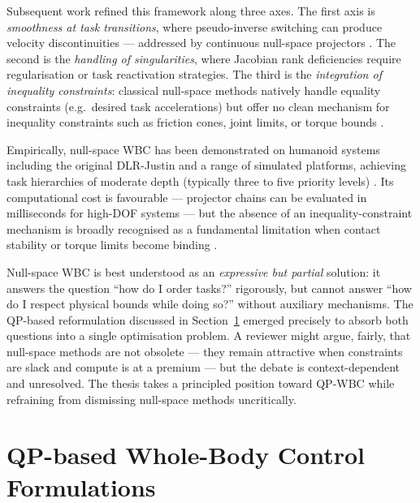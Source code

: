Subsequent work refined this framework along three axes. The first axis
is \emph{smoothness at task transitions}, where pseudo-inverse switching
can produce velocity discontinuities --- addressed by continuous
null-space projectors \cite{Sentis2005}. The second is the \emph{handling
of singularities}, where Jacobian rank deficiencies require regularisation
or task reactivation strategies. The third is the \emph{integration of
inequality constraints}: classical null-space methods natively handle
equality constraints (e.g.\ desired task accelerations) but offer no
clean mechanism for inequality constraints such as friction cones, joint
limits, or torque bounds \cite{Wensing2013}.

Empirically, null-space WBC has been demonstrated on humanoid systems
including the original DLR-Justin and a range of simulated platforms,
achieving task hierarchies of moderate depth (typically three to five
priority levels) \cite{Sentis2005}. Its computational cost is
favourable --- projector chains can be evaluated in milliseconds for
high-DOF systems --- but the absence of an inequality-constraint
mechanism is broadly recognised as a fundamental limitation when contact
stability or torque limits become binding \cite{Wensing2013,Koolen2016}.

\begin{criticalinsight}
Null-space WBC is best understood as an \emph{expressive but partial}
solution: it answers the question ``how do I order tasks?'' rigorously,
but cannot answer ``how do I respect physical bounds while doing so?''
without auxiliary mechanisms. The QP-based reformulation discussed in
Section~\ref{sec:sota_qp} emerged precisely to absorb both questions into
a single optimisation problem. A reviewer might argue, fairly, that
null-space methods are not obsolete --- they remain attractive when
constraints are slack and compute is at a premium --- but the debate is
context-dependent and unresolved. The thesis takes a principled position
toward QP-WBC while refraining from dismissing null-space methods
uncritically.
\end{criticalinsight}


\section{QP-based Whole-Body Control Formulations}
\label{sec:sota_qp}

